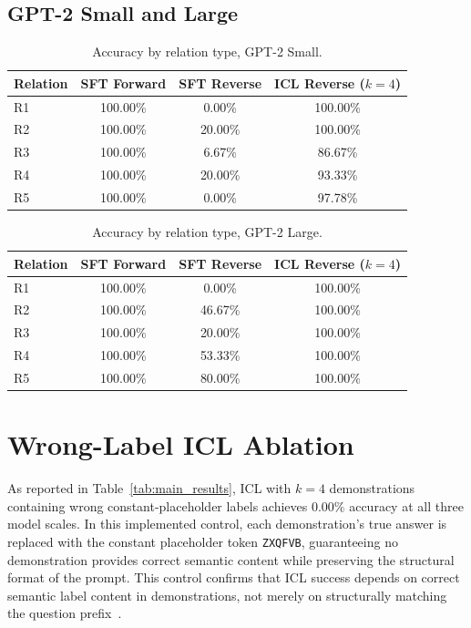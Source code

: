 \documentclass[11pt]{article}
\begin{document}
\subsection{GPT-2 Small and Large}

\begin{table}[H]
\centering
\caption{Accuracy by relation type, GPT-2 Small.}
\label{tab:relation_acc_small}
\begin{tabular}{lccc}
\toprule
\textbf{Relation} & \textbf{SFT Forward} & \textbf{SFT Reverse} & \textbf{ICL Reverse ($k=4$)} \\
\midrule
R1 & 100.00\% &   0.00\% & 100.00\% \\
R2 & 100.00\% &  20.00\% & 100.00\% \\
R3 & 100.00\% &   6.67\% &  86.67\% \\
R4 & 100.00\% &  20.00\% &  93.33\% \\
R5 & 100.00\% &   0.00\% &  97.78\% \\
\bottomrule
\end{tabular}
\end{table}

\begin{table}[H]
\centering
\caption{Accuracy by relation type, GPT-2 Large.}
\label{tab:relation_acc_large}
\begin{tabular}{lccc}
\toprule
\textbf{Relation} & \textbf{SFT Forward} & \textbf{SFT Reverse} & \textbf{ICL Reverse ($k=4$)} \\
\midrule
R1 & 100.00\% &   0.00\% & 100.00\% \\
R2 & 100.00\% &  46.67\% & 100.00\% \\
R3 & 100.00\% &  20.00\% & 100.00\% \\
R4 & 100.00\% &  53.33\% & 100.00\% \\
R5 & 100.00\% &  80.00\% & 100.00\% \\
\bottomrule
\end{tabular}
\end{table}

\section{Wrong-Label ICL Ablation}
\label{app:wronglabel}

As reported in Table~\ref{tab:main_results}, ICL with $k=4$ demonstrations
containing wrong constant-placeholder labels achieves 0.00\% accuracy at all
three model scales. In this implemented control, each demonstration's true
answer is replaced with the constant placeholder token \texttt{ZXQFVB},
guaranteeing no demonstration provides correct semantic content while preserving
the structural format of the prompt. This control confirms that ICL success
depends on correct semantic label content in demonstrations, not merely on
structurally matching the question prefix~\cite{min2022rethinking}.
\end{document}

